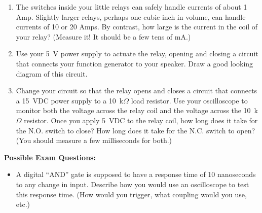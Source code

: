 \begin{enumerate}[wide]
\item The switches inside your little relays can safely handle currents of about 1 Amp.  Slightly larger relays, perhaps one cubic inch in volume, can handle currents of 10 or 20 Amps.  By contrast, how large is the current in the coil of your relay?  (Measure it!  It should be a few tens of mA.)

\item Use your 5~V power supply to actuate the relay, opening and closing a circuit that connects your function generator to your speaker.  Draw a good looking diagram of this circuit.

\item Change your circuit so that the relay opens and closes a circuit that connects a 15~VDC power supply to a 10~k$\Omega$ load resistor.  Use your oscilloscope to monitor both the voltage across the relay coil and the voltage across the 10~k$\Omega$ resistor.  Once you apply 5~VDC to the relay coil, how long does it take for the N.O. switch to close?  How long does it take for the N.C. switch to open?  (You should measure a few milliseconds for both.)


\end{enumerate}

\textbf{Possible Exam Questions:}

\begin{itemize}

\item A digital ``AND'' gate is supposed to have a response time of 10 nanoseconds to any change in input.  Describe how you would use an oscilloscope to test this response time.  (How would you trigger, what coupling would you use, etc.) 

\end{itemize}







